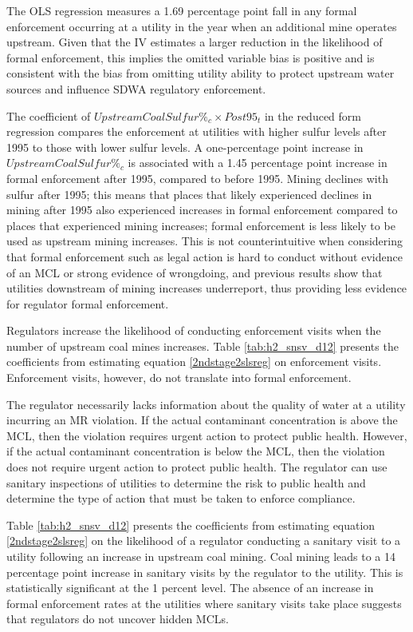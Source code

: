 \documentclass{article}
\begin{document}
The OLS regression measures a 1.69 percentage point fall in any formal enforcement occurring at a utility in the year when an additional mine operates upstream. Given that the IV estimates a larger reduction in the likelihood of formal enforcement, this implies the omitted variable bias is positive and is consistent with the bias from omitting utility ability to protect upstream water sources and influence SDWA regulatory enforcement. 

The coefficient of $UpstreamCoalSulfur\%_c \times Post95_t$ in the reduced form regression compares the enforcement at utilities with higher sulfur levels after 1995 to those with lower sulfur levels. A one-percentage point increase in $UpstreamCoalSulfur\%_c$ is associated with a 1.45 percentage point increase in formal enforcement after 1995, compared to before 1995. Mining declines with sulfur after 1995; this means that places that likely experienced declines in mining after 1995 also experienced increases in formal enforcement compared to places that experienced mining increases; formal enforcement is less likely to be used as upstream mining increases. This is not counterintuitive when considering that formal enforcement such as legal action is hard to conduct without evidence of an MCL or strong evidence of wrongdoing, and previous results show that utilities downstream of mining increases underreport, thus providing less evidence for regulator formal enforcement.

Regulators increase the likelihood of conducting enforcement visits when the number of upstream coal mines increases. Table \ref{tab:h2_snsv_d12} presents the coefficients from estimating equation \ref{2ndstage2slsreg} on enforcement visits. Enforcement visits, however, do not translate into formal enforcement.

The regulator necessarily lacks information about the quality of water at a utility incurring an MR violation. If the actual contaminant concentration is above the MCL, then the violation requires urgent action to protect public health. However, if the actual contaminant concentration is below the MCL, then the violation does not require urgent action to protect public health. The regulator can use sanitary inspections of utilities to determine the risk to public health and determine the type of action that must be taken to enforce compliance.

Table \ref{tab:h2_snsv_d12} presents the coefficients from estimating equation \ref{2ndstage2slsreg} on the likelihood of a regulator conducting a sanitary visit to a utility following an increase in upstream coal mining. Coal mining leads to a 14 percentage point increase in sanitary visits by the regulator to the utility. This is statistically significant at the 1 percent level. The absence of an increase in formal enforcement rates at the utilities where sanitary visits take place suggests that regulators do not uncover hidden MCLs.
\end{document}
